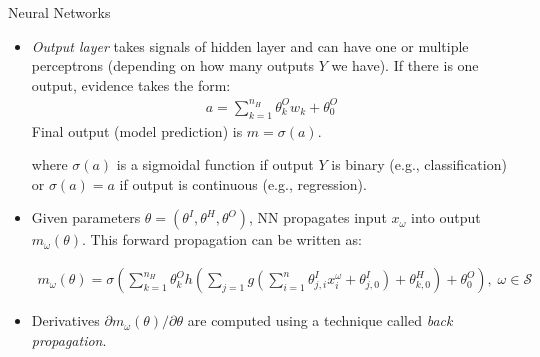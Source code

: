 \documentclass[9pt]{beamer}
\begin{document}
\begin{frame}{Neural Networks}
\begin{itemize}
\item {\em Output layer} takes signals of hidden layer and can have one or multiple perceptrons (depending on how many outputs $Y$ we have). If there is one output,  evidence takes the form:
\begin{align*}
a=\sum_{k=1}^{n_H}\theta_{k}^{O}w_k+\theta_{0}^O
\end{align*}
Final output (model prediction) is $m=\sigma(a)$.

where $\sigma(a)$ is a sigmoidal function if output $Y$ is binary (e.g., classification) or $\sigma(a)=a$ if output is continuous (e.g., regression). 

\item Given parameters $\theta=(\theta^I,\theta^H,\theta^O)$, NN propagates input $x_\omega$ into output $m_{\omega}(\theta)$. This forward propagation can be written as:
\begin{block}{}
\begin{align*}
m_{\omega}(\theta)
=\sigma\left(\sum_{k=1}^{n_H}\theta_{k}^Oh\left(\sum_{j=1}g\left(\sum_{i=1}^n\theta_{j,i}^Ix_i^\omega+\theta_{j,0}^I\right)+\theta_{k,0}^H\right)+\theta_0^O\right),\; \omega \in \mathcal{S}
\end{align*}
\end{block}
\item Derivatives $\partial m_\omega(\theta)/\partial \theta$ are computed using a technique called {\em back propagation}.
\end{itemize}

\end{frame}

\end{document}
